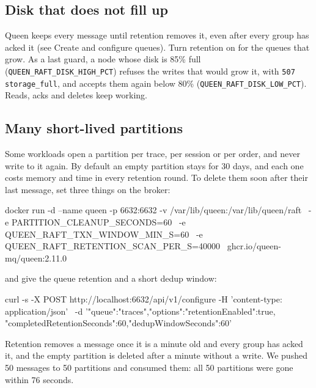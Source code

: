 \subsection{Disk that does not fill up}

Queen keeps every message until retention removes it, even after every group has acked it (see
Create and configure queues). Turn retention on for the queues that grow. As a last guard, a node
whose disk is 85\% full (\texttt{QUEEN\_RAFT\_DISK\_HIGH\_PCT}) refuses the writes that would grow
it, with \texttt{507 storage\_full}, and accepts them again below 80\%
(\texttt{QUEEN\_RAFT\_DISK\_LOW\_PCT}). Reads, acks and deletes keep working.


\subsection{Many short-lived partitions}

Some workloads open a partition per trace, per session or per order, and never write to it again.
By default an empty partition stays for 30 days, and each one costs memory and time in every
retention round. To delete them soon after their last message, set three things on the broker:

\begin{shell}
docker run -d --name queen -p 6632:6632 -v /var/lib/queen:/var/lib/queen/raft \
  -e PARTITION_CLEANUP_SECONDS=60 \
  -e QUEEN_RAFT_TXN_WINDOW_MIN_S=60 \
  -e QUEEN_RAFT_RETENTION_SCAN_PER_S=40000 \
  ghcr.io/queen-mq/queen:2.11.0
\end{shell}

and give the queue retention and a short dedup window:

\begin{shell}
curl -s -X POST http://localhost:6632/api/v1/configure -H 'content-type: application/json' \
  -d '{"queue":"traces","options":{"retentionEnabled":true,
       "completedRetentionSeconds":60,"dedupWindowSeconds":60}}'
\end{shell}

Retention removes a message once it is a minute old and every group has acked it, and the empty
partition is deleted after a minute without a write. We pushed 50 messages to 50 partitions and
consumed them: all 50 partitions were gone within 76 seconds.

